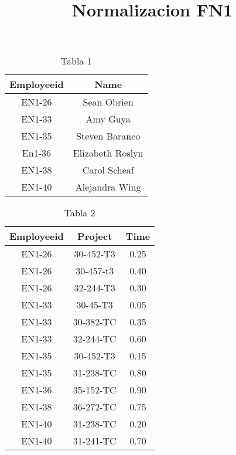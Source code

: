 \documentclass[letterpaper,12pt]{article}
\title{\textbf{Normalizacion FN1}}
\begin{document}
\maketitle

    \begin{table}[h!]
        \begin{center}
        \begin{tabular}{|c|c|}
        \hline
        \textbf{Employeeid}&\textbf{Name}\\
        \hline
        EN1-26 & Sean Obrien\\\hline
        EN1-33 & Amy Guya\\\hline
        EN1-35 & Steven Baranco\\\hline
        En1-36 & Elizabeth Roslyn\\\hline
        EN1-38 & Carol Scheaf\\\hline
        EN1-40 & Alejandra Wing\\
        \hline
        \end{tabular}
        \end{center}
    \caption{Tabla 1}
    \end{table}
   
   \begin{table}[h!]
        \begin{center}
        \begin{tabular}{|c|c|c|}
        \hline
        \textbf{Employeeid}&\textbf{Project}&\textbf{Time}\\
        \hline
        EN1-26 & 30-452-T3& 0.25 \\\hline
        EN1-26 & 30-457-t3& 0.40\\\hline
        EN1-26 & 32-244-T3& 0.30\\\hline
        EN1-33 & 30-45-T3& 0.05\\\hline
        EN1-33 & 30-382-TC& 0.35\\\hline
        EN1-33 & 32-244-TC&0.60\\\hline
        EN1-35 & 30-452-T3&0.15\\\hline
        EN1-35 & 31-238-TC&0.80\\\hline
        EN1-36 & 35-152-TC&0.90\\\hline
        EN1-38 & 36-272-TC&0.75\\\hline
        EN1-40 & 31-238-TC&0.20\\\hline
        EN1-40 & 31-241-TC&0.70\\\hline
        
        \hline
        \end{tabular}
        \end{center}
        \caption{Tabla 2}
    \end{table}
\end{document}
